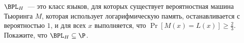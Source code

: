 $\BPL_H$~--- это класс языков, для которых существует вероятностная машина Тьюринга $M$, которая
использует логарифмическую память, останавливается с вероятностью $1$, и для всех $x$ выполняется, что
$\Pr[M(x) = L(x)] \ge \frac{2}{3}$. Покажите, что $\BPL_H \subseteq \P$.
